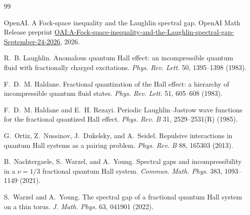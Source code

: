 \documentclass[11pt]{article}
\begin{document}
\setcounter{tocdepth}{2}
\tableofcontents












\appendix



\begin{thebibliography}{99}

OpenAI.
\newblock A {F}ock-space inequality and the {L}aughlin spectral gap.
\newblock OpenAI Math Release preprint
  \href{https://github.com/openai/math/blob/main/preprints/A-Fock-space-inequality-and-the-Laughlin-spectral-gap-September-24-2026/A-Fock-space-inequality-and-the-Laughlin-spectral-gap-September-24-2026.pdf}{OAI:A-Fock-space-inequality-and-the-Laughlin-spectral-gap-September-24-2026},
  2026.

R.~B. Laughlin.
\newblock Anomalous quantum {H}all effect: an incompressible quantum fluid with fractionally charged excitations.
\newblock \emph{Phys. Rev. Lett.} 50, 1395--1398 (1983).

F.~D.~M. Haldane.
\newblock Fractional quantization of the {H}all effect: a hierarchy of incompressible quantum fluid states.
\newblock \emph{Phys. Rev. Lett.} 51, 605--608 (1983).

F.~D.~M. Haldane and E.~H. Rezayi.
\newblock Periodic {L}aughlin--{J}astrow wave functions for the fractional quantized {H}all effect.
\newblock \emph{Phys. Rev. B} 31, 2529--2531(R) (1985).

G.~Ortiz, Z.~Nussinov, J.~Dukelsky, and A.~Seidel.
\newblock Repulsive interactions in quantum {H}all systems as a pairing problem.
\newblock \emph{Phys. Rev. B} 88, 165303 (2013).

B.~Nachtergaele, S.~Warzel, and A.~Young.
\newblock Spectral gaps and incompressibility in a $\nu=1/3$ fractional quantum {H}all system.
\newblock \emph{Commun. Math. Phys.} 383, 1093--1149 (2021).

S.~Warzel and A.~Young.
\newblock The spectral gap of a fractional quantum {H}all system on a thin torus.
\newblock \emph{J. Math. Phys.} 63, 041901 (2022).


\end{thebibliography}
\end{document}
